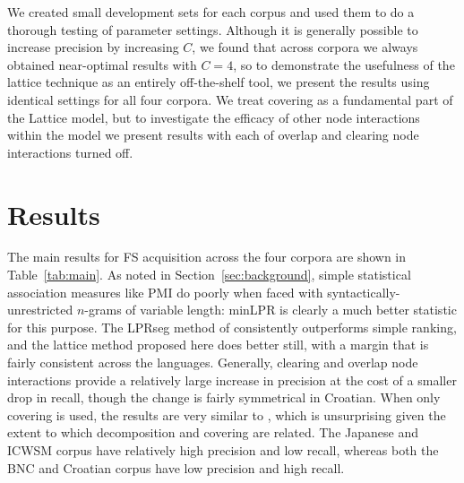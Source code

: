 \documentclass[11pt,letterpaper]{article}
\newcommand{\tabref}[2][]{Table#1~\ref{#2}\xspace}
\newcommand{\secref}[2][]{Section#1~\ref{#2}\xspace}
\begin{document}


We created small development sets for each corpus and used them to do a thorough testing of parameter settings. Although it is generally possible to increase precision by increasing $C$, we found that across corpora we always obtained near-optimal results with $C=4$, so to demonstrate the usefulness of the lattice technique as an entirely off-the-shelf tool, we present the results using identical settings for all four corpora. We treat covering as a fundamental part of the Lattice model, but to investigate the efficacy of other node interactions within the model we present results with each of overlap and clearing node interactions turned off.
		

\section{Results}

The main results for FS acquisition across the four corpora are shown in \tabref{tab:main}. As noted in \secref{sec:background}, simple statistical association measures like PMI do poorly when faced with syntactically-unrestricted $n$-grams of variable length: minLPR is clearly a much better statistic for this purpose. The LPRseg method of  consistently outperforms simple ranking, and the lattice method proposed here does better still, with a margin that is fairly consistent across the languages. Generally, clearing and overlap node interactions provide a relatively large increase in precision at the cost of a smaller drop in recall, though the change is fairly symmetrical in Croatian.  When only covering is used, the results are very similar to , which is unsurprising given the extent to which decomposition and covering are related. The Japanese and ICWSM corpus have relatively high precision and low recall, whereas both the BNC and Croatian corpus have low precision and high recall.
\end{document}
